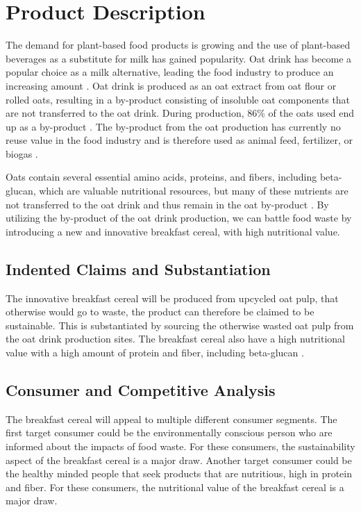 \section{Product Description}
The demand for plant-based food products is growing and the use of plant-based beverages as a substitute for milk has gained popularity. Oat drink has become a popular choice as a milk alternative, leading the food industry to produce an increasing amount \cite*{01_article}. Oat drink is produced as an oat extract from oat flour or rolled oats, resulting in a by-product consisting of insoluble oat components that are not transferred to the oat drink. During production, 86\% of the oats used end up as a by-product \cite*{01_article}. The by-product from the oat production has currently no reuse value in the food industry and is therefore used as animal feed, fertilizer, or biogas \cite*{02_article}.

\vline 

Oats contain several essential amino acids, proteins, and fibers, including beta-glucan, which are valuable nutritional resources, but many of these nutrients are not transferred to the oat drink and thus remain in the oat by-product \cite*{03_article}. By utilizing the by-product of the oat drink production, we can battle food waste by introducing a new and innovative breakfast cereal, with high nutritional value.  

\subsection{Indented Claims and Substantiation}
The innovative breakfast cereal will be produced from upcycled oat pulp, that otherwise would go to waste, the product can therefore be claimed to be sustainable. This is substantiated by sourcing the otherwise wasted oat pulp from the oat drink production sites. The breakfast cereal also have a high nutritional value with a high amount of protein and fiber, including beta-glucan \cite*{03_article}.

\subsection{Consumer and Competitive Analysis}
The breakfast cereal will appeal to multiple different consumer segments. The first target consumer could be the environmentally conscious person who are informed about the impacts of food waste. For these consumers, the sustainability aspect of the breakfast cereal is a major draw. Another target consumer could be the healthy minded people that seek products that are nutritious, high in protein and fiber. For these consumers, the nutritional value of the breakfast cereal is a major draw.  

